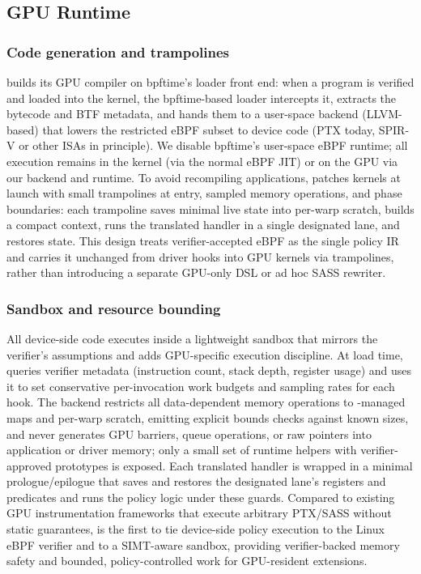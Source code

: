 \subsection{GPU Runtime}
\label{sec:impl-gpu}

\subsubsection{Code generation and trampolines}
\sys builds its GPU compiler on bpftime's loader front end: when a \sys program is verified and loaded into the kernel, the bpftime-based loader intercepts it, extracts the bytecode and BTF metadata, and hands them to a user-space backend (LLVM-based) that lowers the restricted eBPF subset to device code (PTX today, SPIR-V or other ISAs in principle). We disable bpftime's user-space eBPF runtime; all execution remains in the kernel (via the normal eBPF JIT) or on the GPU via our backend and runtime. To avoid recompiling applications, \sys patches kernels at launch with small trampolines at entry, sampled memory operations, and phase boundaries: each trampoline saves minimal live state into per-warp scratch, builds a compact context, runs the translated handler in a single designated lane, and restores state. This design treats verifier-accepted eBPF as the single policy IR and carries it unchanged from driver hooks into GPU kernels via trampolines, rather than introducing a separate GPU-only DSL or ad hoc SASS rewriter.



\subsubsection{Sandbox and resource bounding}
All device-side \sys code executes inside a lightweight sandbox that mirrors the verifier's assumptions and adds GPU-specific execution discipline. At load time, \sys queries verifier metadata (instruction count, stack depth, register usage) and uses it to set conservative per-invocation work budgets and sampling rates for each hook. The backend restricts all data-dependent memory operations to \sys-managed maps and per-warp scratch, emitting explicit bounds checks against known sizes, and never generates GPU barriers, queue operations, or raw pointers into application or driver memory; only a small set of runtime helpers with verifier-approved prototypes is exposed. Each translated handler is wrapped in a minimal prologue/epilogue that saves and restores the designated lane's registers and predicates and runs the policy logic under these guards. Compared to existing GPU instrumentation frameworks that execute arbitrary PTX/SASS without static guarantees, \sys is the first to tie device-side policy execution to the Linux eBPF verifier and to a SIMT-aware sandbox, providing verifier-backed memory safety and bounded, policy-controlled work for GPU-resident extensions.


